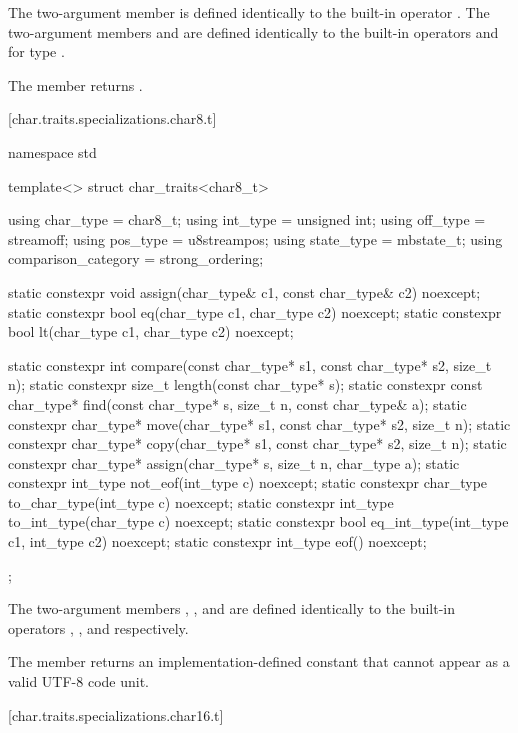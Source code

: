 \pnum
The two-argument member  is defined identically to the
built-in operator \tcode{=}. The two-argument members 
and  are defined identically to the built-in operators
\tcode{==} and \tcode{<} for type .

\pnum
The member
returns
.

[char.traits.specializations.char8.t]{}

%
\begin{codeblock}
namespace std {
  template<> struct char_traits<char8_t> {
    using char_type  = char8_t;
    using int_type   = unsigned int;
    using off_type   = streamoff;
    using pos_type   = u8streampos;
    using state_type = mbstate_t;
    using comparison_category = strong_ordering;

    static constexpr void assign(char_type& c1, const char_type& c2) noexcept;
    static constexpr bool eq(char_type c1, char_type c2) noexcept;
    static constexpr bool lt(char_type c1, char_type c2) noexcept;

    static constexpr int compare(const char_type* s1, const char_type* s2, size_t n);
    static constexpr size_t length(const char_type* s);
    static constexpr const char_type* find(const char_type* s, size_t n,
                                           const char_type& a);
    static constexpr char_type* move(char_type* s1, const char_type* s2, size_t n);
    static constexpr char_type* copy(char_type* s1, const char_type* s2, size_t n);
    static constexpr char_type* assign(char_type* s, size_t n, char_type a);
    static constexpr int_type not_eof(int_type c) noexcept;
    static constexpr char_type to_char_type(int_type c) noexcept;
    static constexpr int_type to_int_type(char_type c) noexcept;
    static constexpr bool eq_int_type(int_type c1, int_type c2) noexcept;
    static constexpr int_type eof() noexcept;
  };
}
\end{codeblock}

\pnum
The two-argument members , , and 
are defined identically to
the built-in operators \tcode{=}, \tcode{==}, and \tcode{<} respectively.

\pnum
The member  returns an implementation-defined constant
that cannot appear as a valid UTF-8 code unit.

[char.traits.specializations.char16.t]{}

